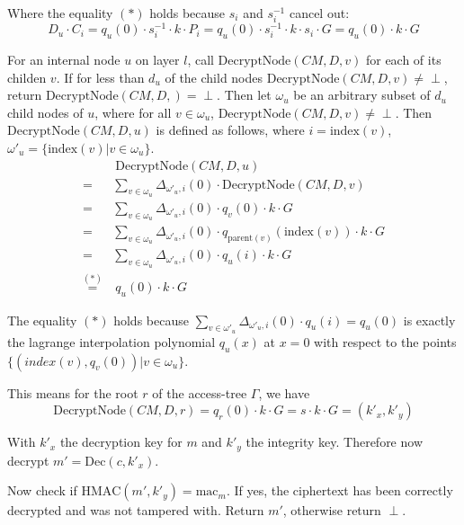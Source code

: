 Where the equality $(*)$ holds because $s_i$ and $s_i^{-1}$ cancel out: 
\begin{equation*}
    D_u \cdot C_i = q_u(0) \cdot s_i^{-1} \cdot k \cdot P_i = q_u(0) \cdot s_i^{-1} \cdot k \cdot s_i \cdot G = q_u(0) \cdot k \cdot G
\end{equation*}

For an internal node $u$ on layer $l$, call $\text{DecryptNode}(CM, D, v)$ for each of its childen $v$. If for less than $d_u$ of the child nodes $\text{DecryptNode}(CM, D, v) \neq \perp$, return $\text{DecryptNode}(CM, D, )=\perp$.
Then let $\omega_u$ be an arbitrary subset of $d_u$ child nodes of $u$, where for all $v \in \omega_u$, $\text{DecryptNode}(CM, D, v) \neq \perp$.
Then $\text{DecryptNode}(CM, D, u)$ is defined as follows, where $i = \text{index}(v)$, $\omega'_u = \{\text{index}(v) | v \in \omega_u\}$.
\begin{equation*}
    \begin{split}
        &~\text{DecryptNode}(CM, D, u)\\
        =& \sum_{v \in \omega_u} \Delta_{\omega'_u, i}(0) \cdot \text{DecryptNode}(CM, D, v)\\
        =& \sum_{v \in \omega_u} \Delta_{\omega'_u, i}(0) \cdot q_v(0) \cdot k \cdot G\\
        =& \sum_{v \in \omega_u} \Delta_{\omega'_u, i}(0) \cdot q_{\text{parent}(v)}(\text{index}(v)) \cdot k \cdot G\\
        =& \sum_{v \in \omega_u} \Delta_{\omega'_u, i}(0) \cdot q_u(i) \cdot k \cdot G\\
        \stackrel{(*)}{=}&~q_u(0) \cdot k \cdot G
    \end{split}
\end{equation*}

The equality $(*)$ holds because $\sum_{v \in \omega'_u} \Delta_{\omega'_u, i}(0) \cdot q_u(i) = q_u(0)$ is exactly the lagrange interpolation polynomial $q_u(x)$ at $x = 0$ with respect to the points $\{(index(v), q_v(0)) | v \in \omega_u\}$. 

This means for the root $r$ of the \gls{access-tree} $\Gamma$, we have
\begin{equation*}
    \text{DecryptNode}(CM, D, r) =  q_r(0) \cdot k \cdot G = s \cdot k \cdot G = (k'_x, k'_y)
\end{equation*}

With $k'_x$ the decryption key for $m$ and $k'_y$ the integrity key. Therefore now decrypt $m' = \text{Dec}(c, k'_x)$.

Now check if $\text{HMAC}(m', k'_y) = \text{mac}_m$. If yes, the ciphertext has been correctly decrypted and was not tampered with. Return $m'$, otherwise return $\perp$.